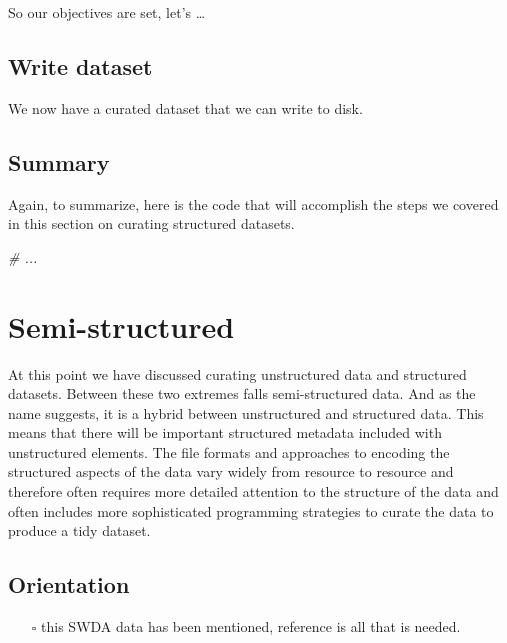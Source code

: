 \documentclass[
  letterpaper,
  DIV=11,
  numbers=noendperiod]{scrreport}
\newenvironment{Shaded}{\begin{snugshade}}{\end{snugshade}}
\newcommand{\CommentTok}[1]{\textcolor[rgb]{0.00,0.00,0.00}{\textit{#1}}}
\providecommand{\tightlist}{%
  \setlength{\itemsep}{0pt}\setlength{\parskip}{0pt}}\usepackage{longtable,booktabs,array}
\theoremstyle{definition}
\theoremstyle{remark}
\begin{document}
So our objectives are set, let's \ldots{}

\hypertarget{write-dataset-1}{%
\subsection{Write dataset}\label{write-dataset-1}}

We now have a curated dataset that we can write to disk.

\hypertarget{summary-6}{%
\subsection{Summary}\label{summary-6}}

Again, to summarize, here is the code that will accomplish the steps we
covered in this section on curating structured datasets.

\begin{Shaded}
\begin{Highlighting}[]
\CommentTok{\# ...}
\end{Highlighting}
\end{Shaded}

\hypertarget{semi-structured}{%
\section{Semi-structured}\label{semi-structured}}

At this point we have discussed curating unstructured data and
structured datasets. Between these two extremes falls semi-structured
data. And as the name suggests, it is a hybrid between unstructured and
structured data. This means that there will be important structured
metadata included with unstructured elements. The file formats and
approaches to encoding the structured aspects of the data vary widely
from resource to resource and therefore often requires more detailed
attention to the structure of the data and often includes more
sophisticated programming strategies to curate the data to produce a
tidy dataset.

\hypertarget{orientation-2}{%
\subsection{Orientation}\label{orientation-2}}

\begin{itemize}
\tightlist
\item[$\square$]
  this SWDA data has been mentioned, reference is all that is needed.
\end{itemize}
\end{document}

